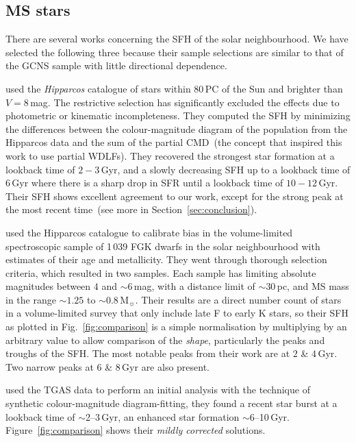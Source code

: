 \documentclass[fleqn,usenatbib]{mnras}
\begin{document}
\subsection{MS stars}
There are several works concerning the SFH of the solar neighbourhood. We
have selected the following three because their sample selections are similar
to that of the GCNS sample with little directional dependence.

\citet{2006A&A...459..783C} used the \textit{Hipparcos} catalogue of stars
within 80\,PC of the Sun and brighter than $V=8$\,mag. The restrictive selection
has significantly excluded the effects due to photometric or kinematic
incompleteness. They computed the SFH by minimizing the differences between the
colour-magnitude diagram of the population from the Hipparcos data and the
sum of the partial CMD~(the concept that inspired this work to use partial
WDLFs). They recovered the strongest star formation at a lookback time of
$2-3$\,Gyr, and a slowly decreasing SFH up to a lookback time of $6$\,Gyr where
there is a sharp drop in SFR until a lookback time of $10-12$\,Gyr. Their SFH
shows excellent agreement to our work, except for the strong peak at the most
recent time~(see more in Section~\ref{sec:conclusion}).

\citet{2007ApJ...665..767R} used the Hipparcos catalogue to calibrate
bias in the \citet{2005ApJS..159..141V} volume-limited spectroscopic
sample of 1\,039 FGK dwarfs in the solar neighbourhood with estimates of
their age and metallicity. They went through thorough selection criteria,
which resulted in two samples. Each sample has limiting absolute magnitudes
between $4$ and $\sim$$6$\,mag, with a distance limit of $\sim$$30$\,pc, and MS mass
in the range $\sim1.25$ to $\sim0.8$\,M$_{\sun}$. Their results are a direct
number count of stars in a volume-limited survey that only include late F to
early K stars, so their SFH as plotted in Fig.~\ref{fig:comparison} is a simple
normalisation by multiplying by an arbitrary value to allow comparison of the
\textit{shape}, particularly the peaks and troughs of the SFH. The most notable
peaks from their work are at $2$ \& $4$\,Gyr. Two narrow peaks at $6$ \&
$8$\,Gyr are also present.

\citet{2018IAUS..330..148B} used the TGAS data to perform an initial
analysis with the technique of synthetic colour-magnitude diagram-fitting, they
found a recent star burst at a lookback time of $\sim$2--3\,Gyr, an enhanced
star formation $\sim$6--10\,Gyr. Figure~\ref{fig:comparison} shows their
\textit{mildly corrected} solutions.
\end{document}

